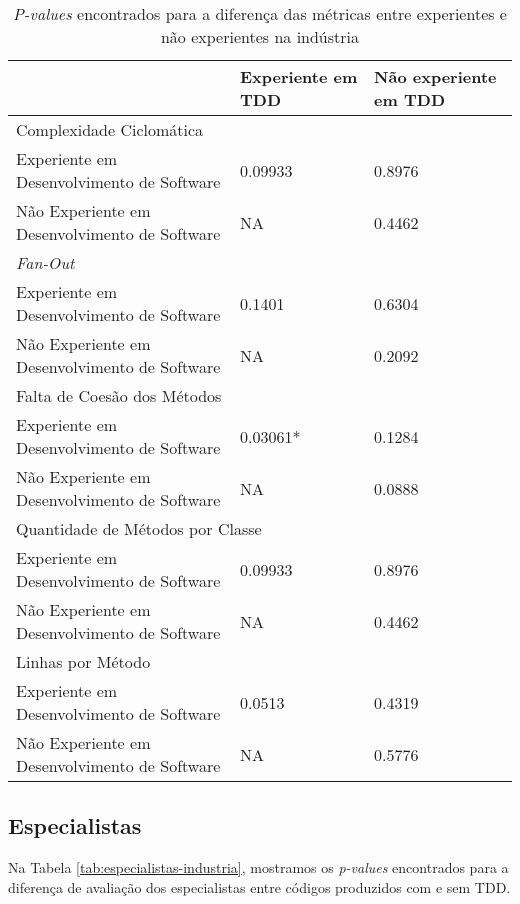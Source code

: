 \documentclass[conference]{IEEEtran}
\begin{document}
\begin{table}
	\centering
	\begin{tabular}{ | p{3cm} | p{2cm} | p{2cm} | }
		\hline
		  & \textbf{Experiente em TDD} & \textbf{Não experiente em TDD} \\
		\hline
			\multicolumn{3}{|l|}{Complexidade Ciclomática} \\
		\hline
			Experiente em Desenvolvimento de Software 		& 0.09933	&	0.8976\\
			\hline
			Não Experiente em Desenvolvimento de Software 	& NA		&	0.4462\\
		\hline
			\multicolumn{3}{|l|}{\textit{Fan-Out}}\\
		\hline
			Experiente em Desenvolvimento de Software 		& 0.1401	&	0.6304\\
			\hline
			Não Experiente em Desenvolvimento de Software 	& NA		&	0.2092\\
		\hline
			\multicolumn{3}{|l|}{Falta de Coesão dos Métodos}\\
		\hline
			Experiente em Desenvolvimento de Software 		& \cellcolor[gray]{0.8}0.03061*	&	0.1284\\
			\hline
			Não Experiente em Desenvolvimento de Software 	& NA		&	0.0888\\
		\hline
			\multicolumn{3}{|l|}{Quantidade de Métodos por Classe} \\
		\hline
			Experiente em Desenvolvimento de Software 		& 0.09933	&	0.8976\\
			\hline
			Não Experiente em Desenvolvimento de Software 	& NA		&	0.4462\\
		\hline
			\multicolumn{3}{|l|}{Linhas por Método}\\
		\hline
			Experiente em Desenvolvimento de Software 		& 0.0513	&	0.4319\\
			\hline
			Não Experiente em Desenvolvimento de Software 	& NA		&	0.5776\\
		\hline
	\end{tabular}
	\caption{\textit{P-values} encontrados para a diferença das métricas entre experientes e não experientes na indústria}
	\label{valores-separados}
\end{table}

\subsection{Especialistas}

Na Tabela
\ref{tab:especialistas-industria},
mostramos os \textit{p-values} encontrados para a diferença de avaliação dos especialistas
entre códigos produzidos com e sem TDD.
\end{document}
